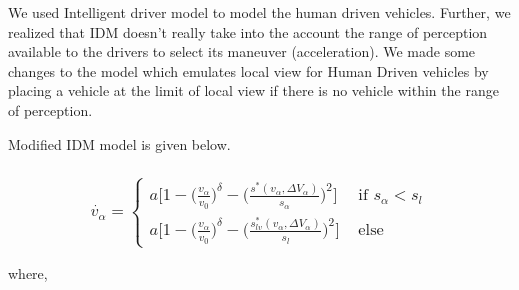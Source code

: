 \documentclass[11pt]{article}
\def\lt{<}
\begin{document}
    We used Intelligent driver model to model the human driven vehicles.
Further, we realized that IDM doesn't really take into the account the
range of perception available to the drivers to select its maneuver
(acceleration). We made some changes to the model which emulates local
view for Human Driven vehicles by placing a vehicle at the limit of
local view if there is no vehicle within the range of perception.

Modified IDM model is given below.

\subsubsection{\texorpdfstring{\[\dot{v_{\alpha}} = \begin{cases} a \bigg[ 1 - \big(\frac{v_{\alpha}}{v_{0}}\big)^{\delta} - \bigg( \frac{s^{*}(v_{\alpha},\Delta{V}_{\alpha})}{s_{\alpha}} \bigg)^{2} \bigg] & \text{ if } s_{\alpha} \lt s_{l} \\ a \bigg[ 1 - \big(\frac{v_{\alpha}}{v_{0}}\big)^{\delta} - \bigg( \frac{s^{*}_{lv}(v_{\alpha},\Delta{V}_{\alpha})}{s_{l}} \bigg)^{2} \bigg] & \text{ else } \end{cases} \]}{\textbackslash{}dot\{v\_\{\textbackslash{}alpha\}\} = \textbackslash{}begin\{cases\} a \textbackslash{}bigg{[} 1 - \textbackslash{}big(\textbackslash{}frac\{v\_\{\textbackslash{}alpha\}\}\{v\_\{0\}\}\textbackslash{}big)\^{}\{\textbackslash{}delta\} - \textbackslash{}bigg( \textbackslash{}frac\{s\^{}\{*\}(v\_\{\textbackslash{}alpha\},\textbackslash{}Delta\{V\}\_\{\textbackslash{}alpha\})\}\{s\_\{\textbackslash{}alpha\}\} \textbackslash{}bigg)\^{}\{2\} \textbackslash{}bigg{]} \& \textbackslash{}text\{ if \} s\_\{\textbackslash{}alpha\} \textbackslash{}lt s\_\{l\} \textbackslash{}\textbackslash{} a \textbackslash{}bigg{[} 1 - \textbackslash{}big(\textbackslash{}frac\{v\_\{\textbackslash{}alpha\}\}\{v\_\{0\}\}\textbackslash{}big)\^{}\{\textbackslash{}delta\} - \textbackslash{}bigg( \textbackslash{}frac\{s\^{}\{*\}\_\{lv\}(v\_\{\textbackslash{}alpha\},\textbackslash{}Delta\{V\}\_\{\textbackslash{}alpha\})\}\{s\_\{l\}\} \textbackslash{}bigg)\^{}\{2\} \textbackslash{}bigg{]} \& \textbackslash{}text\{ else \} \textbackslash{}end\{cases\} }}\label{dotv_alpha-begincases-a-bigg-1---bigfracv_alphav_0bigdelta---bigg-fracsv_alphadeltav_alphas_alpha-bigg2-bigg-text-if-s_alpha-lt-s_l-a-bigg-1---bigfracv_alphav_0bigdelta---bigg-fracs_lvv_alphadeltav_alphas_l-bigg2-bigg-text-else-endcases}

where,
\end{document}
